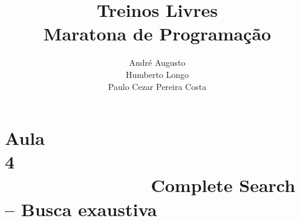 \documentclass{beamer}
\title[Treinos Livres]{Treinos Livres\\ Maratona de Programação}
\author[{\tiny André, Humberto, Paulo Cezar}]{André Augusto\\ Humberto Longo\\ Paulo Cezar Pereira Costa }
\institute[]{Instituto de Informática\\
           Universidade Federal de Goiás}
\begin{document}
\beamertemplatenavigationsymbolsempty
\maketitle


%
%
%

%

\section{Aula 4\ \ \ \ \ \ \ \ \ \ \ \ \ \ \ \ \ \ \ \ \ \ \ \ \ \ \ \ \ \ \ \ \ \ \ \ \ \ \ \ \ \ \ \ \  Complete Search -- Busca exaustiva}

\end{document}
